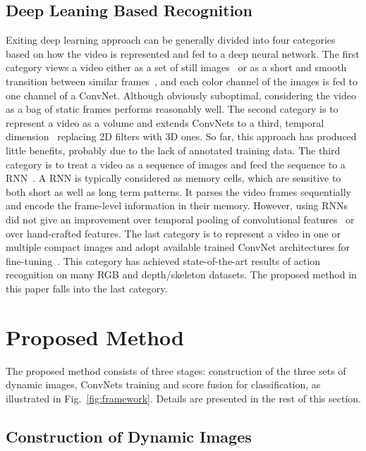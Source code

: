 \documentclass[10pt, a4paper, conference]{IEEEtran}
\begin{document}
\subsection{Deep Leaning Based Recognition}
Exiting deep learning approach can be generally divided into four categories based on how the video is represented and fed to a deep neural network. The first category views a video either as a set of still images~\cite{yue2015beyond} or as a short and smooth transition between similar frames~\cite{simonyan2014two}, and each color channel of the images is fed to one channel of a ConvNet. Although obviously suboptimal, considering the video as a bag of static frames performs reasonably well. The second category is to represent a video as a volume and extends ConvNets to a third, temporal dimension~\cite{ji20133d,tran2015learning} replacing 2D filters with 3D ones. So far, this approach has produced little benefits, probably due to the lack of annotated training data. The third category is to treat a video as a sequence of images and feed the sequence to a RNN~\cite{donahue2015long,du2015hierarchical,veeriah2015differential,zhu2015co,shahroudy2016ntu}. A RNN is typically considered as memory cells, which are sensitive to both short as well as long term patterns. It parses the video frames sequentially and encode the frame-level information in their memory. However, using RNNs did not give an improvement over temporal pooling of convolutional features~\cite{yue2015beyond} or over hand-crafted features. The last category is to represent a video in one or multiple compact images and adopt available trained ConvNet architectures for fine-tuning~\cite{pichao2015,pichaoTHMS,pichao2016,bilen2016dynamic}. This category has achieved state-of-the-art results of action recognition on many RGB and depth/skeleton datasets. The proposed method in this paper falls into the last category.

\section{Proposed Method}

The proposed method consists of three stages: construction of the three sets of dynamic images, ConvNets training and score fusion for classification, as illustrated in Fig.~\ref{fig:framework}. Details are presented in the rest of this section.

\subsection{Construction of Dynamic Images}
\end{document}
